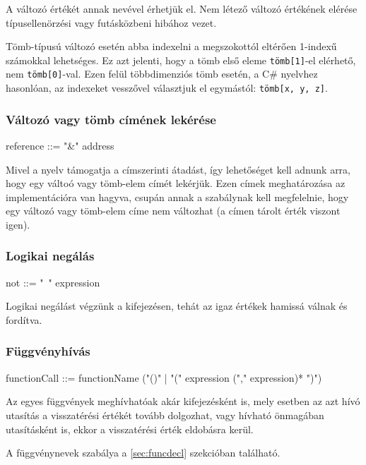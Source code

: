 A változó értékét annak nevével érhetjük el. Nem létező változó értékének elérése típusellenörzési vagy futásközbeni hibához vezet.

Tömb-típusú változó esetén abba indexelni a megszokottól eltérően 1-indexű számokkal lehetséges. Ez azt jelenti, hogy a tömb első eleme \texttt{tömb[1]}-el elérhető, nem \texttt{tömb[0]}-val. Ezen felül többdimenziós tömb esetén, a C\# nyelvhez hasonlóan, az indexeket vesszővel választjuk el egymástól: \texttt{tömb[x, y, z]}.

\subsubsection{Változó vagy tömb címének lekérése}

\begin{ebnf}
reference ::= "&" address
\end{ebnf}

Mivel a nyelv támogatja a címszerinti átadást, így lehetőséget kell adnunk arra, hogy egy váltoó vagy tömb-elem címét lekérjük. Ezen címek meghatározása az implementációra van hagyva, csupán annak a szabálynak kell megfelelnie, hogy egy változó vagy tömb-elem címe nem változhat (a címen tárolt érték viszont igen).

\subsubsection{Logikai negálás}

\begin{ebnf}
not ::= "~" expression
\end{ebnf}

Logikai negálást végzünk a kifejezésen, tehát az igaz értékek hamissá válnak és fordítva.

\subsubsection{Függvényhívás}

\begin{ebnf}
functionCall ::= functionName ("()" | "(" expression ("," expression)* ")")
\end{ebnf}

Az egyes függvények meghívhatóak akár kifejezésként is, mely esetben az azt hívó utasítás a visszatérési értékét tovább dolgozhat, vagy hívható önmagában utasításként is, ekkor a visszatérési érték eldobásra kerül.

A függvénynevek szabálya a \ref{sec:funcdecl} szekcióban található.

